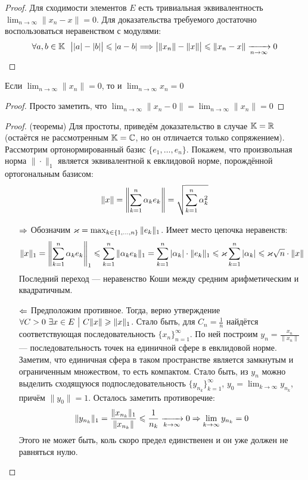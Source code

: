 \begin{proof}
	Для сходимости элементов $E$ есть тривиальная эквивалентность \\ $\lim_{n \to \infty} \|x_n - x\| = 0$. Для доказательства требуемого достаточно воспользоваться неравенством с модулями:
	\[
		\forall a, b \in \mathbb{K}\ \ \big||a| - |b|\big| \leqslant |a - b| \Longrightarrow \big|\|x_n\| - \|x\|\big| \leqslant \|x_n - x\| \xrightarrow[n \to \infty]{} 0
	\]
\end{proof}

\begin{corollary}
	Если $\lim_{n \to \infty} \|x_n\| = 0$, то и $\lim_{n \to \infty} x_n = 0$
\end{corollary}

\begin{proof}
	Просто заметить, что $\lim_{n \to \infty} \|x_n - 0\| = \lim_{n \to \infty} \|x_n\| = 0$
\end{proof}

\begin{proof} (теоремы)
	Для простоты, приведём доказательство в случае $\mathbb{K} = \mathbb{R}$ (остаётся не рассмотренным $\mathbb{K} = \mathbb{C}$, но он отличается только сопряжением). Рассмотрим ортонормированный базис $\{e_1, \ldots, e_n\}$. Покажем, что произвольная норма $\|\cdot\|_1$ является эквивалентной к евклидовой норме, порождённой ортогональным базисом:
	\[
		\|x\| = \left\|\sum_{k = 1}^n \alpha_k e_k\right\| = \sqrt{\sum_{k = 1}^n \alpha_k^2}
	\]
	\begin{itemize}
		\item[$\Rightarrow$] Обозначим $\varkappa = \max_{k \in \{1, \ldots, n\}} \|e_k\|_1$. Имеет место цепочка неравенств:
		\[
			\|x\|_1 = \left\|\sum_{k = 1}^n \alpha_ke_k\right\|_1 \leqslant \sum_{k = 1}^n \|\alpha_ke_k\|_1 = \sum_{k = 1}^n |\alpha_k| \cdot \|e_k\|_1 \leqslant \varkappa \sum_{k = 1}^n |\alpha_k| \leqslant \varkappa \sqrt{n} \cdot \|x\|
		\]
		Последний переход --- неравенство Коши между средним арифметическим и квадратичным.
		
		\item[$\Leftarrow$] Предположим противное. Тогда, верно утверждение $\forall C > 0\ \exists x \in E \ \big|\  C\|x\| \geqslant \|x\|_1$. Стало быть, для $C_n = \frac{1}{n}$ найдётся соответствующая последовательность $\{x_n\}_{n = 1}^\infty$. По ней построим $y_n = \frac{x_n}{\|x_n\|}$ --- последовательность точек на единичной сфере в евклидовой норме. Заметим, что единичная сфера в таком пространстве является замкнутым и ограниченным множеством, то есть компактом. Стало быть, из $y_n$ можно выделить сходящуюся подпоследовательность $\{y_{n_k}\}_{k = 1}^\infty$, $y_0 = \lim_{k \to \infty} y_{n_k}$, причём $\|y_0\| = 1$. Осталось заметить противоречие:
		\[
			\|y_{n_k}\|_1 = \frac{\|x_{n_k}\|_1}{\|x_{n_k}\|} \leqslant \frac{1}{n_k} \xrightarrow[k \to \infty]{} 0 \Rightarrow \lim_{k \to \infty} y_{n_k} = 0
		\]
		Этого не может быть, коль скоро предел единственен и он уже должен не равняться нулю.
	\end{itemize}
\end{proof}

